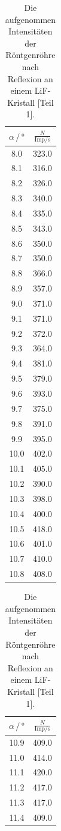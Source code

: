 \begin{table}
\centering
  \caption{Die aufgenommen Intensitäten der Röntgenröhre nach Reflexion an einem LiF-Kristall [Teil 1].}
  \begin{tabular}[t]{cc}
  \toprule
  $\alpha \,/\, \si{\degree} $ & $\frac{N}{\text{Imp}/\si{\second}}$\\
  \midrule
  8.0 & 323.0 \\
  8.1 & 316.0\\
  8.2 & 326.0\\
  8.3 & 340.0\\
  8.4 & 335.0\\
  8.5 & 343.0\\
  8.6 & 350.0\\
  8.7 & 350.0\\
  8.8 & 366.0\\
  8.9 & 357.0\\
  9.0 & 371.0\\
  9.1 & 371.0\\
  9.2 & 372.0\\
  9.3 & 364.0\\
  9.4 & 381.0\\
  9.5 & 379.0\\
  9.6 & 393.0\\
  9.7 & 375.0\\
  9.8 & 391.0\\
  9.9 & 395.0\\
  10.0 & 402.0\\
  10.1 & 405.0\\
  10.2 & 390.0\\
  10.3 & 398.0\\
  10.4 & 400.0\\
  10.5 & 418.0\\
  10.6 & 401.0\\
  10.7 & 410.0\\
  10.8 & 408.0\\
  \bottomrule
  \end{tabular}
  \begin{tabular}[t]{cc}
  \toprule
  $\alpha \,/\, \si{\degree} $ & $\frac{N}{\text{Imp}/\si{\second}}$ \\
  \midrule
  10.9 & 409.0\\
  11.0 & 414.0\\
  11.1 & 420.0\\
  11.2 & 417.0\\
  11.3 & 417.0\\
  11.4 & 409.0\\

\end{tabular}
\end{table}
